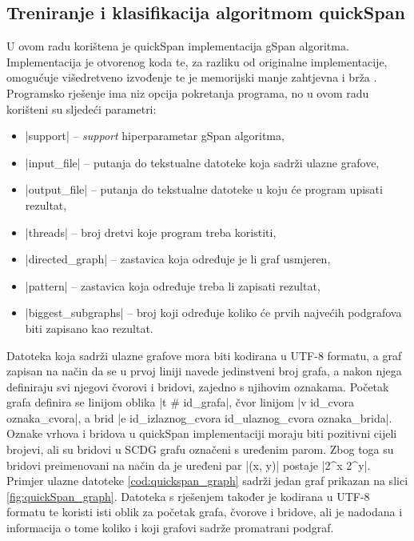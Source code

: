 \subsection{Treniranje i klasifikacija algoritmom quickSpan}
U ovom radu korištena je quickSpan implementacija gSpan algoritma. 
Implementacija je otvorenog koda te, za razliku od originalne implementacije, 
omogućuje višedretveno izvođenje te je memorijski manje zahtjevna i brža
\cite{quickspan}. Programsko rješenje ima niz opcija pokretanja programa, no u
ovom radu korišteni su sljedeći parametri:
\begin{itemize}
    \item \inlinecode|support| -- \textit{support} hiperparametar gSpan algoritma, 
    \item \inlinecode|input_file| -- putanja do tekstualne datoteke koja sadrži
    ulazne grafove,
    \item \inlinecode|output_file| -- putanja do tekstualne datoteke u koju će
    program upisati rezultat,
    \item \inlinecode|threads| -- broj dretvi koje program treba koristiti,
    \item \inlinecode|directed_graph| -- zastavica koja određuje je li graf usmjeren,
    \item \inlinecode|pattern| -- zastavica koja određuje treba li zapisati rezultat,
    \item \inlinecode|biggest_subgraphs| -- broj koji određuje koliko će prvih
    najvećih podgrafova biti zapisano kao rezultat.
\end{itemize}

Datoteka koja sadrži ulazne grafove mora biti kodirana u UTF-8 formatu, a graf
zapisan na način da se u prvoj liniji navede jedinstveni broj grafa, a nakon
njega definiraju svi njegovi čvorovi i bridovi, zajedno s njihovim oznakama. 
Početak grafa definira se linijom oblika \inlinecode|t # id_grafa|, čvor linijom
\inlinecode|v id_cvora oznaka_cvora|, a brid 
\inlinecode|e id_izlaznog_cvora id_ulaznog_cvora oznaka_brida|. Oznake vrhova i
bridova u quickSpan implementaciji moraju biti pozitivni cijeli brojevi, ali su
bridovi u SCDG grafu označeni s uređenim parom. Zbog toga su bridovi
preimenovani na način da je uređeni par \inlinecode|(x, y)| postaje
\inlinecode|2^x 2^y|. Primjer ulazne datoteke \ref{cod:quickspan_graph} sadrži jedan graf 
prikazan na slici \ref{fig:quickSpan_graph}. Datoteka s rješenjem također je kodirana u UTF-8 formatu
te koristi isti oblik za početak grafa, čvorove i bridove, ali je nadodana i 
informacija o tome koliko i koji grafovi sadrže promatrani podgraf. 



